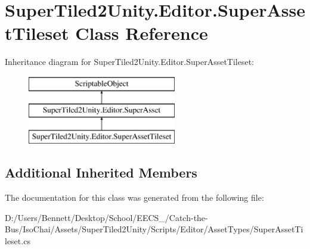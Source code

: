 \hypertarget{class_super_tiled2_unity_1_1_editor_1_1_super_asset_tileset}{}\section{Super\+Tiled2\+Unity.\+Editor.\+Super\+Asset\+Tileset Class Reference}
\label{class_super_tiled2_unity_1_1_editor_1_1_super_asset_tileset}
Inheritance diagram for Super\+Tiled2\+Unity.\+Editor.\+Super\+Asset\+Tileset\+:\begin{figure}[H]
\begin{center}
\leavevmode
\includegraphics[height=3.000000cm]{class_super_tiled2_unity_1_1_editor_1_1_super_asset_tileset}
\end{center}
\end{figure}
\subsection*{Additional Inherited Members}


The documentation for this class was generated from the following file\+:\begin{DoxyCompactItemize}
\item 
D\+:/\+Users/\+Bennett/\+Desktop/\+School/\+E\+E\+C\+S\+\_/\+Catch-\/the-\/\+Bus/\+Iso\+Chai/\+Assets/\+Super\+Tiled2\+Unity/\+Scripts/\+Editor/\+Asset\+Types/Super\+Asset\+Tileset.\+cs\end{DoxyCompactItemize}
